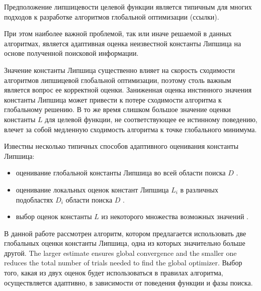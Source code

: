 \documentclass[runningheads]{llncs}
\begin{document}
Предположение липшицевости целевой функции является типичным для многих подходов к разработке алгоритмов глобальной оптимизации (ссылки). 


При этом наиболее важной проблемой, так или иначе решаемой в данных алгоритмах, является адаптивная оценка неизвестной константы Липшица на основе полученной поисковой информации. 

Значение константы Липшица существенно влияет на скорость сходимости алгоритмов липшицевой глобальной оптимизации, поэтому столь важным является вопрос ее корректной оценки. Заниженная оценка инстинного значения константы Липшица может привести к потере сходимости алгоритма к глобальному решению. В то же время слишком большое значение оценки константы $L$ для целевой функции, %
не соответствующее ее истинному поведению, влечет за собой медленную сходимость алгоритма к точке глобального минимума. 

Известны несколько типичных способов адаптивного оценивания константы Липшица:
\begin{itemize}
	\item оценивание глобальной константы Липшица во всей области поиска $D$ \cite{Horst1996,Pinter1996,Strongin2000}.
	\item оценивание локальных оценок констант Липшица $L_i$ в различных подобластях $D_i$ области поиска $D$ \cite{Kvasov2003,Sergeyev2010,Sergeyev2016}.
	\item выбор оценок константы $L$ из некоторого множества возможных значений \cite{Jones1993,Gablonsky2001,Jones2009,Sergeyev2006}.
\end{itemize}


В данной работе рассмотрен алгоритм, котором предлагается использовать две глобальных оценки константы Липшица, одна из которых значительно больше другой. 
The larger estimate ensures global convergence and the smaller one reduces the total number of trials needed to find the global optimizer.
Выбор того, какая из двух оценок будет использоваться в правилах алгоритма, осуществляется адаптивно, в зависимости от поведения функции и фазы поиска.
\end{document}
